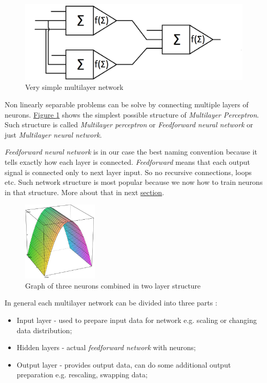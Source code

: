 \begin{figure}[!h]
    \centering
    \includegraphics[scale=0.2]{Media/MLN.png}
    \caption[Multilayer network]{Very simple multilayer network}
    \label{fig:MLN}
\end{figure}

Non linearly separable problems can be solve by connecting multiple layers of neurons. \hyperref[fig:MLN]{Figure \ref{fig:MLN}} shows the simplest possible structure of \textit{Multilayer Perceptron}. Such structure is called \textit{Multilayer perceptron} or \textit{Feedforward neural network} or just \textit{Multilayer neural network}.

\textit{Feedforward neural network} is in our case the best naming convention because it tells exactly how each layer is connected. \textit{Feedforward} means that each output signal is connected only to next layer input. So no recursive connections, loops etc. Such network structure is most popular because we now how to train neurons in that structure. More about that in next \hyperref[sec:Training]{section}.

\begin{figure}
    \includegraphics[width=0.32\textwidth]{Media/Bridge.png}
    \caption{Graph of three neurons combined in two layer structure}
    \label{fig:BridgeGraph}
\end{figure}

In general each multilayer network can be divided into three parts \cite{mlpPawelRosczak,mlpFSaC,fsmlpDwrSkrMk}:
\begin{itemize}
    \item \label{InputLayer} Input layer - used to prepare input data for network e.g. scaling or changing data distribution;
    \item \label{HiddenLayer} Hidden layers - actual \textit{feedforward network} with neurons; 
    \item \label{OutputLayer} Output layer - provides output data, can do some additional output preparation e.g. rescaling, swapping data;
\end{itemize}


